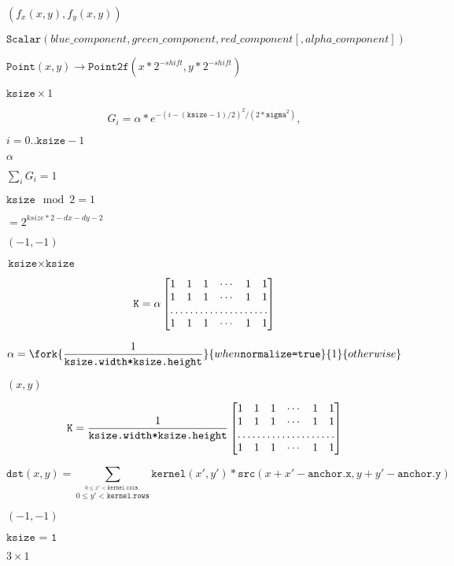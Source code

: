\documentclass{article}
\begin{document}
$(f_x(x,y), f_y(x,y))$
\pagebreak

\[\texttt{Scalar} (blue \_ component, green \_ component, red \_ component[, alpha \_ component])\]
\pagebreak

$\texttt{Point}(x,y)\rightarrow\texttt{Point2f}(x*2^{-shift},y*2^{-shift})$
\pagebreak

$\texttt{ksize} \times 1$
\pagebreak

\[G_i= \alpha *e^{-(i-( \texttt{ksize} -1)/2)^2/(2* \texttt{sigma}^2)},\]
\pagebreak

$i=0..\texttt{ksize}-1$
\pagebreak

$\alpha$
\pagebreak

$\sum_i G_i=1$
\pagebreak

$\texttt{ksize} \mod 2 = 1$
\pagebreak

$=2^{ksize*2-dx-dy-2}$
\pagebreak

$(-1, -1)$
\pagebreak

$\texttt{ksize} \times \texttt{ksize}$
\pagebreak

\[\texttt{K} = \alpha \begin{bmatrix} 1 & 1 & 1 & \cdots & 1 & 1 \\ 1 & 1 & 1 & \cdots & 1 & 1 \\ \hdotsfor{6} \\ 1 & 1 & 1 & \cdots & 1 & 1 \end{bmatrix}\]
\pagebreak

\[\alpha = \fork{\frac{1}{\texttt{ksize.width*ksize.height}}}{when \texttt{normalize=true}}{1}{otherwise}\]
\pagebreak

$ (x, y) $
\pagebreak

\[\texttt{K} = \frac{1}{\texttt{ksize.width*ksize.height}} \begin{bmatrix} 1 & 1 & 1 & \cdots & 1 & 1 \\ 1 & 1 & 1 & \cdots & 1 & 1 \\ \hdotsfor{6} \\ 1 & 1 & 1 & \cdots & 1 & 1 \\ \end{bmatrix}\]
\pagebreak

\[\texttt{dst} (x,y) = \sum _{ \stackrel{0\leq x' < \texttt{kernel.cols},}{0\leq y' < \texttt{kernel.rows}} } \texttt{kernel} (x',y')* \texttt{src} (x+x'- \texttt{anchor.x} ,y+y'- \texttt{anchor.y} )\]
\pagebreak

$(-1,-1)$
\pagebreak

$\texttt{ksize = 1}$
\pagebreak

$3 \times 1$
\pagebreak
\end{document}
